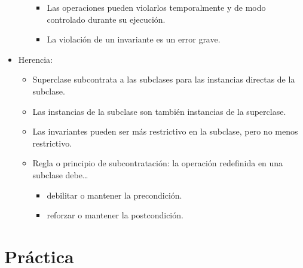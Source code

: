 \documentclass[12pt, twoside, openright]{report} %
\begin{document}
\begin{itemize}
\begin{itemize}
        \begin{itemize}
        
        \item
          Las operaciones pueden violarlos temporalmente y de modo
          controlado durante su ejecución.
        \item
          La violación de un invariante es un error grave.
        \end{itemize}
      \end{itemize}

	  \item
      Herencia:

      \begin{itemize}
      
      \item
        Superclase subcontrata a las subclases para las instancias
        directas de la subclase.
      \item
        Las instancias de la subclase son también instancias de la
        superclase.
      \item
        Las invariantes pueden ser más restrictivo en la subclase, pero
        no menos restrictivo.
      \item
        Regla o principio de subcontratación: la operación redefinida en
        una subclase debe\ldots{}

        \begin{itemize}
			\item
			debilitar o mantener la precondición.
			\item
			reforzar o mantener la postcondición.
        \end{itemize}
      
      \end{itemize}
    \end{itemize}



\chapter{Práctica}
  
  
\end{document}
